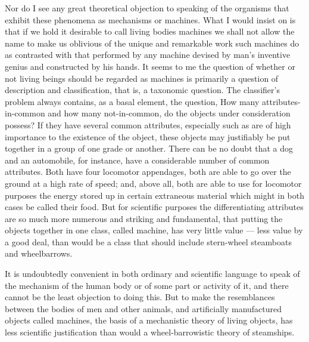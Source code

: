 \documentclass[a4paper, 11pt, oneside, polutonikogreek, english, landscape]{article}
\begin{document}
Nor do I see any great theoretical objection to speaking of the organisms that exhibit these phenomena as mechanisms or machines. What I would insist on is that if we hold it desirable to call living bodies machines we shall not allow the name to make us oblivious of the unique and remarkable work such machines do as contrasted with that performed by any machine devised by man's inventive genius and constructed by his hands. It seems to me the question of whether or not living beings should be regarded as machines is primarily a question of description and classification, that is, a taxonomic question. The classifier's problem always contains, as a basal element, the question, How many attributes-in-common and how many not-in-common, do the objects under consideration possess? If they have several common attributes, especially such as are of high importance to the existence of the object, these objects may justifiably be put together in a group of one grade or another. There can be no doubt that a dog and an automobile, for instance, have a considerable number of common attributes. Both have four locomotor appendages, both are able to go over the ground at a high rate of speed; and, above all, both are able to use for locomotor purposes the energy stored up in certain extraneous material which might in both cases be called their food. But for scientific purposes the differentiating attributes are so much more numerous and striking and fundamental, that putting the objects together in one class, called machine, has very little value --- less value by a good deal, than would be a class that should include stern-wheel steamboats and wheelbarrows.

It is undoubtedly convenient in both ordinary and scientific language to speak of the mechanism of the human body or of some part or activity of it, and there cannot be the least objection to doing this. But to make the resemblances between the bodies of men and other animals, and artificially manufactured objects called machines, the basis of a mechanistic theory of living objects, has less scientific justification than would a wheel-barrowistic theory of steamships.

\subsection{}
\end{document}
